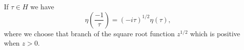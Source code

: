 If $\tau \in H$ we have
$$\eta \left( \frac{-1}{\tau} \right) = (-i\tau)^{1/2} \eta(\tau),$$
where we choose that branch of the square root function $z^{1/2}$ which is positive when $z > 0$.
